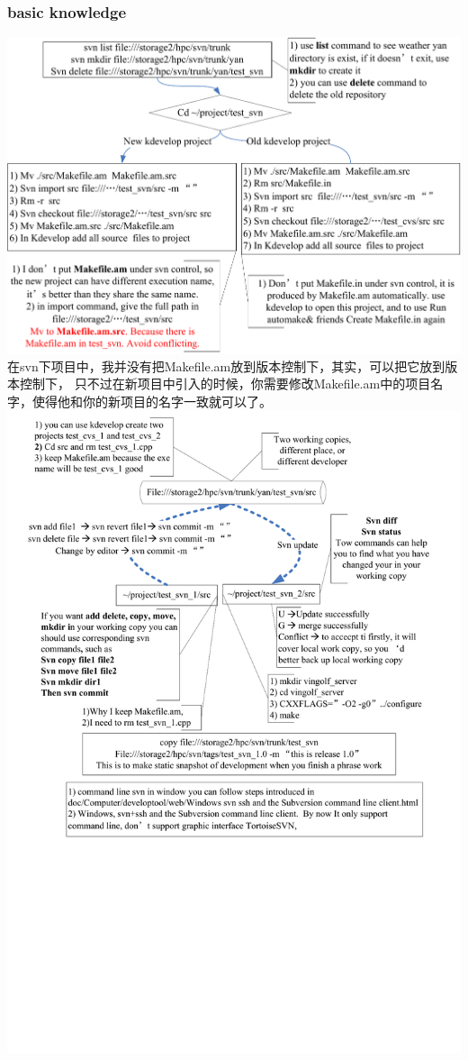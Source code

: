 \documentclass[a4paper,12pt,twoside]{book}
\begin{document}
\begin{CJK*}{UTF8}{song}
\subsubsection{basic knowledge}
	\includegraphics[scale=0.8]{pics/svn1_clip} \\
	 在svn下项目中，我并没有把Makefile.am放到版本控制下，其实，可以把它放到版本控制下， 只不过在新项目中引入的时候，你需要修改Makefile.am中的项目名字，使得他和你的新项目的名字一致就可以了。 \\

	\includegraphics[scale=0.8]{pics/svn2_clip} \\


\end{CJK*}
\end{document}

